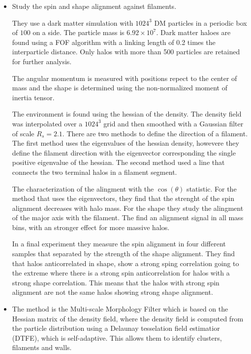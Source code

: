 \documentclass[usenatbib]{mn2e}
\newcommand{\hMpc}{{\ifmmode{h^{-1}{\rm Mpc}}\else{$h^{-1}$Mpc }\fi}}
\newcommand{\hMsun}{{\ifmmode{h^{-1}{\rm {M_{\odot}}}}\else{$h^{-1}{\rm{M_{\odot}}}$}\fi}}
\begin{document}
\begin{itemize}
\item
\citep{Zhang2009}
Study the spin and shape alignment against filaments. 

They use a dark matter simulation with $1024^3$ DM particles in a
periodic box of $100$ \hMpc on a side. The particle mass is
$6.92\times10^{7}$\hMsun. Dark matter haloes are found using a FOF
algorithm with a linking length of 0.2 times the interparticle
distance. Only halos with more than 500 particles are retained for
further analysis. 

The angular momentum is measured with positions repect to the center
of mass and the shape is determined using the non-normalized moment of
inertia tensor.

The environment is found using the hessian of the density. The density
field was interpolated over a $1024^3$ grid and then smoothed with a
Gaussian filter of scale $R_{s} = 2.1$\hMpc. There are two methods to
define the direction of a filament. The first method uses the
eigenvalues of the hessian density, howevere they define the filament
direction with the eigenvector corresponding the single positive
eigenvalue of the hessian. The second method used a line that
connects the two terminal halos in a filament segment.


The characterization of the alingment with the $\cos(\theta)$
statistic. For the method that uses the eigenvectors, they find that
the strenght of the spin alignment decreases with halo mass. For the
shape they study the alingment of the major axis with the
filament. The find an alignment signal in all mass bins, with an stronger
effect for more massive halos. 

In a final experiment they measure the spin alignment in four
different samples that separated by the strength of the shape
alignment. They find that halos anticorrelated in shape, show a strong
sping correlation going to the extreme where there is a strong spin
anticorrelation for halos with a strong shape correlation. This means
that the halos with strong spin alignment are not the same halos
showing strong shape alignment. 


\item 
\citep{AragonCalvo2007} %
The method is the Multi-scale Morphology Filter which is based on the
Hessian matrix of the density field, where the density field is
computed from the particle distribution using a Delaunay tesselation
field estimatior (DTFE), which is self-adaptive. This allows them to
identify clusters, filaments and walls.



\end{itemize}
\end{document}
